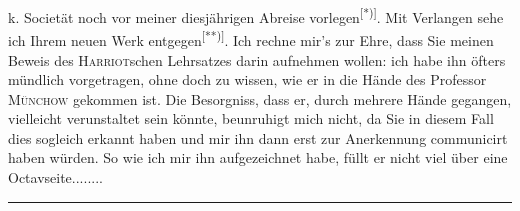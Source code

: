\clearpage
{}
\noindent k. Societät noch vor meiner diesjährigen Abreise vorlegen\textsuperscript{[*)]}. Mit Verlangen sehe ich Ihrem neuen Werk entgegen\textsuperscript{[**)]}. Ich rechne mir’s zur Ehre, dass Sie meinen Beweis des \textsc{Harriot}schen Lehrsatzes darin aufnehmen wollen: ich habe ihn öfters mündlich vorgetragen, ohne doch zu wissen, wie er in die Hände des Professor \textsc{Münchow} gekommen ist. Die Besorgniss, dass er, durch mehrere Hände gegangen, vielleicht verunstaltet sein könnte, beunruhigt mich nicht, da Sie in diesem Fall dies sogleich erkannt haben und mir ihn dann erst zur Anerkennung communicirt haben würden. So wie ich mir ihn aufgezeichnet habe, füllt er nicht viel über eine Octavseite.\quad .\enspace .\enspace .\enspace .\enspace .\enspace .\enspace .
\par\vfill\noindent\rule{.25\linewidth}{.4pt}\par\smallskip
\begingroup\footnotesize
{}\par
{}\par\endgroup
\clearpage
\endgroup
